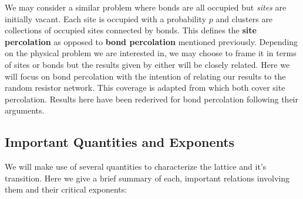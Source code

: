 We may consider a similar problem where bonds are all occupied but \emph{sites}
are initially vacant.  Each site is occupied with a probability $p$ and clusters
are collections of occupied sites connected by bonds.  This defines the
\textbf{site percolation} as opposed to \textbf{bond percolation} mentioned previously.
Depending on the physical problem we are interested in, we may choose to frame
it in terms of sites or bonds but the results given by either will be closely
related.  Here we will focus on bond percolation with the intention of relating our
results to the random resistor network.  This coverage is adapted from
\cite{Stauffer1994} \cite{Christensen2002} which both cover site percolation.
Results here have been rederived for bond percolation following their arguments.


\subsection{Important Quantities and Exponents}

We will make use of several quantities to characterize the lattice and it's transition.
Here we give a brief summary of each, important relations
involving them and their critical exponents:

